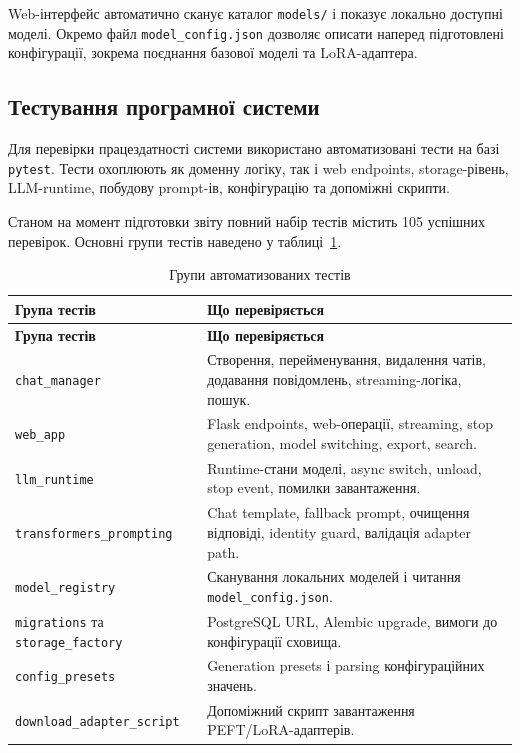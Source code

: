 Web-інтерфейс автоматично сканує каталог \texttt{models/} і показує локально доступні моделі. Окремо файл \texttt{model\_config.json} дозволяє описати наперед підготовлені конфігурації, зокрема поєднання базової моделі та LoRA-адаптера.

\subsection{Тестування програмної системи}

Для перевірки працездатності системи використано автоматизовані тести на базі \texttt{pytest}. Тести охоплюють як доменну логіку, так і web endpoints, storage-рівень, LLM-runtime, побудову prompt-ів, конфігурацію та допоміжні скрипти.

Станом на момент підготовки звіту повний набір тестів містить 105 успішних перевірок. Основні групи тестів наведено у таблиці~\ref{tab:test-groups}.

\begin{longtable}{|p{5cm}|p{10cm}|}
\caption{Групи автоматизованих тестів}
\label{tab:test-groups}\\
\hline
\textbf{Група тестів} & \textbf{Що перевіряється} \\
\hline
\endfirsthead
\hline
\textbf{Група тестів} & \textbf{Що перевіряється} \\
\hline
\endhead
\texttt{chat\_manager} & Створення, перейменування, видалення чатів, додавання повідомлень, streaming-логіка, пошук. \\
\hline
\texttt{web\_app} & Flask endpoints, web-операції, streaming, stop generation, model switching, export, search. \\
\hline
\texttt{llm\_runtime} & Runtime-стани моделі, async switch, unload, stop event, помилки завантаження. \\
\hline
\texttt{transformers\_prompting} & Chat template, fallback prompt, очищення відповіді, identity guard, валідація adapter path. \\
\hline
\texttt{model\_registry} & Сканування локальних моделей і читання \texttt{model\_config.json}. \\
\hline
\texttt{migrations} та \texttt{storage\_factory} & PostgreSQL URL, Alembic upgrade, вимоги до конфігурації сховища. \\
\hline
\texttt{config\_presets} & Generation presets і parsing конфігураційних значень. \\
\hline
\texttt{download\_adapter\_script} & Допоміжний скрипт завантаження PEFT/LoRA-адаптерів. \\
\hline
\end{longtable}
\normalsize

